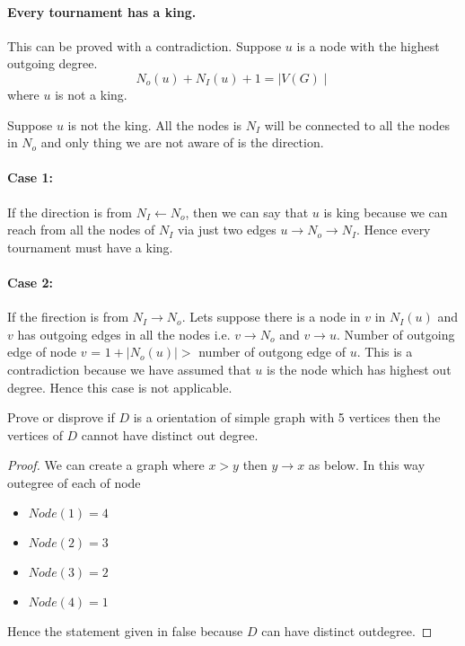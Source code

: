\paragraph{Every tournament has a king.}This can be proved with a contradiction. Suppose $u$ is a node with the highest outgoing degree. 
\begin{equation}
    {\textstyle N_o(u) +  N_I(u) + 1 = \mid V(G) \mid} 
 \end{equation} where $u$ is not a king.

Suppose $u$ is not the king. All the nodes is $N_I$ will be connected to all the nodes in $N_o$ and only thing we are not aware of is the direction.
\paragraph{Case 1:}If the direction is from $N_I \gets N_o$, then we can say that $u$ is king because we can reach from all the nodes of $N_I$ via just two edges $ u \to N_o \to N_I$. Hence every tournament must have a king.
\paragraph{Case 2:}If the firection is from $N_I \to N_o$. Lets suppose there is a node in $v$ in $N_I(u)$ and $v$ has outgoing edges in all the nodes i.e. $ v \to N_o$ and $ v \to u$. Number of outgoing edge of node $v$ = $1 + \mid N_o(u)\mid >$ number of outgong edge of $u$. This is a contradiction because we have assumed that $u$ is the node which has highest out degree. Hence this case is not applicable.



\begin{theorem} Prove or disprove if $D$ is a orientation of simple graph with 5 vertices then the vertices of $D$ cannot have distinct out degree.
\end{theorem}
\begin{proof}
We can create a graph where $x > y$ then $y \to x$ as below. In this way outegree of each of node \begin{itemize}
    \item $Node(1) = 4$ 
    \item $Node(2) = 3$ 
    \item $Node(3) = 2$
    \item $Node(4) = 1$
\end{itemize}
Hence the statement given in false because $D$ can have distinct outdegree.
\end{proof}



